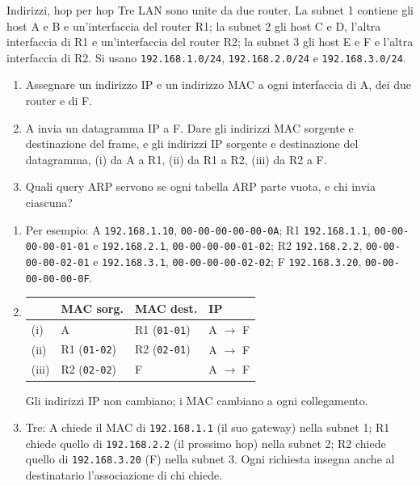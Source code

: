 \begin{esercizio}{Indirizzi, hop per hop}
Tre LAN sono unite da due router. La subnet 1 contiene gli host A e B e un'interfaccia del router R1; la subnet 2 gli host C e D, l'altra
interfaccia di R1 e un'interfaccia del router R2; la subnet 3 gli host E e F e l'altra interfaccia di R2. Si usano \texttt{192.168.1.0/24},
\texttt{192.168.2.0/24} e \texttt{192.168.3.0/24}.
\begin{enumerate}[label=(\alph*)]
    \item Assegnare un indirizzo IP e un indirizzo MAC a ogni interfaccia di A, dei due router e di F.
    \item A invia un datagramma IP a F. Dare gli indirizzi MAC sorgente e destinazione del frame, e gli indirizzi IP sorgente e destinazione
          del datagramma, (i) da A a R1, (ii) da R1 a R2, (iii) da R2 a F.
    \item Quali query ARP servono se ogni tabella ARP parte vuota, e chi invia ciascuna?
\end{enumerate}

\svolgimento
\begin{enumerate}[label=(\alph*)]
    \item Per esempio: A \texttt{192.168.1.10}, \texttt{00-00-00-00-00-0A}; R1 \texttt{192.168.1.1}, \texttt{00-00-00-00-01-01} e
          \texttt{192.168.2.1}, \texttt{00-00-00-00-01-02}; R2 \texttt{192.168.2.2}, \texttt{00-00-00-00-02-01} e \texttt{192.168.3.1},
          \texttt{00-00-00-00-02-02}; F \texttt{192.168.3.20}, \texttt{00-00-00-00-00-0F}.
    \item \begin{tabular}[t]{llll}
          \toprule
           & \textbf{MAC sorg.} & \textbf{MAC dest.} & \textbf{IP} \\
          \midrule
          (i) & A & R1 (\texttt{01-01}) & A $\rightarrow$ F \\
          (ii) & R1 (\texttt{01-02}) & R2 (\texttt{02-01}) & A $\rightarrow$ F \\
          (iii) & R2 (\texttt{02-02}) & F & A $\rightarrow$ F \\
          \bottomrule
          \end{tabular}

          Gli indirizzi IP non cambiano; i MAC cambiano a ogni collegamento.
    \item Tre: A chiede il MAC di \texttt{192.168.1.1} (il suo gateway) nella subnet 1; R1 chiede quello di \texttt{192.168.2.2} (il
          prossimo hop) nella subnet 2; R2 chiede quello di \texttt{192.168.3.20} (F) nella subnet 3. Ogni richiesta insegna anche al
          destinatario l'associazione di chi chiede.
\end{enumerate}
\end{esercizio}

